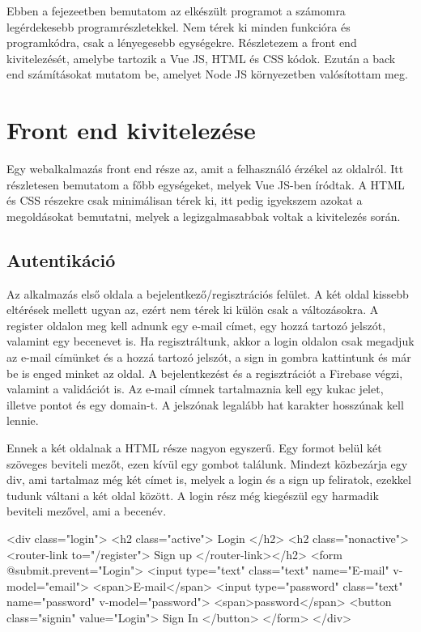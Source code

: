 Ebben a fejezeetben bemutatom az elkészült programot a számomra legérdekesebb programrészletekkel. Nem térek ki minden funkcióra és programkódra, csak a lényegesebb egységekre. Részletezem a front end kivitelezését, amelybe tartozik a Vue JS, HTML és CSS kódok. Ezután a back end számításokat mutatom be, amelyet Node JS környezetben valósítottam meg.

\section{Front end kivitelezése}
Egy webalkalmazás front end része az, amit a felhasználó érzékel az oldalról. Itt részletesen bemutatom a főbb egységeket, melyek Vue JS-ben íródtak. A HTML és CSS részekre csak minimálisan térek ki, itt pedig igyekszem azokat a megoldásokat bemutatni, melyek a legizgalmasabbak voltak a kivitelezés során. 

\subsection{Autentikáció}
Az alkalmazás első oldala a bejelentkező/regisztrációs felület. A két oldal kissebb eltérések mellett ugyan az, ezért nem térek ki külön csak a változásokra. A register oldalon meg kell adnunk egy e-mail címet, egy hozzá tartozó jelszót, valamint egy becenevet is. Ha regisztráltunk, akkor a login oldalon csak megadjuk az e-mail címünket és a hozzá tartozó jelszót, a sign in gombra kattintunk és már be is enged minket az oldal. A bejelentkezést és a regisztrációt a Firebase végzi, valamint a validációt is. Az e-mail címnek tartalmaznia kell egy kukac jelet, illetve pontot és egy domain-t. A jelszónak legalább hat karakter hosszúnak kell lennie.

Ennek a két oldalnak a HTML része nagyon egyszerű. Egy formot belül két szöveges beviteli mezőt, ezen kívül egy gombot találunk. Mindezt közbezárja egy div, ami tartalmaz még két címet is, melyek a login és a sign up feliratok, ezekkel tudunk váltani a két oldal között. A login rész még kiegészül egy harmadik beviteli mezővel, ami a becenév.

\begin{html5}
<div class="login">
  <h2 class="active"> Login </h2>
  <h2 class="nonactive"><router-link to="/register"> Sign up </router-link></h2> 
  <form @submit.prevent="Login">
    <input type="text" class="text" name="E-mail" v-model="email">
    <span>E-mail</span>
    <input type="password" class="text" name="password" v-model="password">
    <span>password</span>
    <button class="signin" value="Login">
      Sign In
    </button>
  </form>
</div>
\end{html5}

